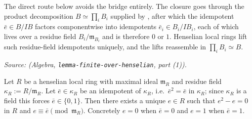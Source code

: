 The direct route below avoids the bridge entirely. The closure goes
through the product decomposition $B \simeq \prod_i B_i$ supplied by
, after which the idempotent $\bar e \in B/IB$
factors componentwise into idempotents $\bar e_i \in B_i / IB_i$,
each of which lives over a residue field $B_i / \mathfrak m_{B_i}$
and is therefore $0$ or $1$. Henselian local rings lift such
residue-field idempotents uniquely, and the lifts reassemble in
$\prod_i B_i \simeq B$.

\textit{Source:  (Algebra,
\texttt{lemma-finite-over-henselian}, part (1)).}

\begin{lemma}[Henselian lift of a residue idempotent for $f := X^2 - X$]
\label{lem:henselianPair-idempotent-lift-x2-minus-x}
Let $R$ be a henselian local ring with maximal ideal $\mathfrak m_R$
and residue field $\kappa_R := R / \mathfrak m_R$. Let
$\bar e \in \kappa_R$ be an idempotent of $\kappa_R$, i.e.\
$\bar e^2 = \bar e$ in $\kappa_R$; since $\kappa_R$ is a field
this forces $\bar e \in \{0, 1\}$. Then there exists a unique
$e \in R$ such that $e^2 - e = 0$ in $R$ and $e \equiv \bar e
\pmod{\mathfrak m_R}$. Concretely $e = 0$ when $\bar e = 0$ and
$e = 1$ when $\bar e = 1$.
\end{lemma}

